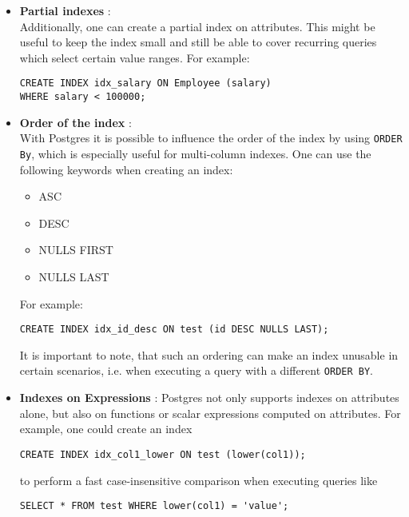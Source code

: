 \documentclass[11pt]{scrartcl}
\begin{document}
\begin{itemize}
    \item \textbf{Partial indexes} \cite{PostgreSQL2024IndexesPartial}:\\
    Additionally, one can create a partial index on attributes.
    This might be useful to keep the index small and still be able to cover recurring queries which select certain
    value ranges.
    For example:
    \begin{lstlisting}[style=dbtsql]
CREATE INDEX idx_salary ON Employee (salary)
WHERE salary < 100000;
    \end{lstlisting}
    \item \textbf{Order of the index} \cite{PostgreSQL2024IndexesOrdering}:\\
    With Postgres it is possible to influence the order of the index by using \texttt{ORDER By}, which is especially
    useful for multi-column indexes.
    One can use the following keywords when creating an index:
    \begin{itemize}
        \item ASC
        \item DESC
        \item NULLS FIRST
        \item NULLS LAST
    \end{itemize}
    For example:
    \begin{lstlisting}[style=dbtsql]
CREATE INDEX idx_id_desc ON test (id DESC NULLS LAST);
    \end{lstlisting}

    It is important to note, that such an ordering can make an index unusable in certain scenarios, i.e. when executing
    a query with a different \texttt{ORDER BY}.
    \item \textbf{Indexes on Expressions} \cite{PostgreSQL2024IndexesOnExpressions}:
    Postgres not only supports indexes on attributes alone, but also on functions or scalar expressions computed on
    attributes.
    For example, one could create an index
    \begin{lstlisting}[style=dbtsql]
CREATE INDEX idx_col1_lower ON test (lower(col1));
    \end{lstlisting}
    to perform a fast case-insensitive comparison when executing queries like
    \begin{lstlisting}[style=dbtsql]
SELECT * FROM test WHERE lower(col1) = 'value';
    \end{lstlisting}
\end{itemize}
\end{document}
